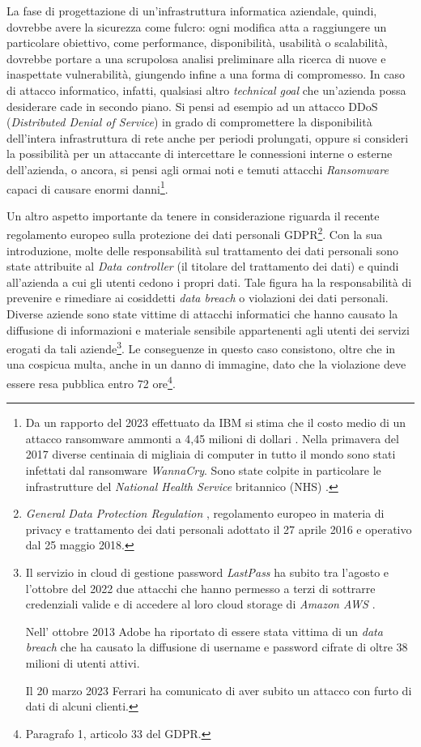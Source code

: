 \documentclass[target=bach,aauheader=]{thud}
\begin{document}
La fase di progettazione di un’infrastruttura informatica aziendale, quindi, dovrebbe avere la sicurezza come fulcro: ogni modifica atta a raggiungere un particolare obiettivo, come performance, disponibilità, usabilità o scalabilità, dovrebbe portare a una scrupolosa analisi preliminare alla ricerca di nuove e inaspettate vulnerabilità, giungendo infine a una forma di compromesso. In caso di attacco informatico, infatti, qualsiasi altro \textit{technical goal} che un’azienda possa desiderare cade in secondo piano. Si pensi ad esempio ad un attacco DDoS (\textit{Distributed Denial of Service}) in grado di compromettere la disponibilità dell’intera infrastruttura di rete anche per periodi prolungati, oppure si consideri la possibilità per un attaccante di intercettare le connessioni interne o esterne dell’azienda, o ancora, si pensi agli ormai noti e temuti attacchi \textit{Ransomware} capaci di causare enormi danni\footnote{Da un rapporto del 2023 effettuato da IBM si stima che il costo medio di un attacco ransomware ammonti a 4,45 milioni di dollari \cite{ibm}.
Nella primavera del 2017 diverse centinaia di migliaia di computer in tutto il mondo sono stati infettati dal ransomware \textit{WannaCry}. Sono state colpite in particolare le infrastrutture del \textit{National Health Service} britannico (NHS) \cite{nhs}.
}.

Un altro aspetto importante da tenere in considerazione riguarda il recente regolamento europeo sulla protezione dei dati personali GDPR\footnote{\textit{General Data Protection Regulation} \cite{gdpr}, regolamento europeo in materia di privacy e trattamento dei dati personali adottato il 27 aprile 2016 e operativo dal 25 maggio 2018.}. Con la sua introduzione, molte delle responsabilità sul trattamento dei dati personali sono state attribuite al \textit{Data controller} (il titolare del trattamento dei dati) e quindi all’azienda a cui gli utenti cedono i propri dati. Tale figura ha la responsabilità di prevenire e rimediare ai cosiddetti \textit{data breach} o violazioni dei dati personali. Diverse aziende sono state vittime di attacchi informatici che hanno causato la diffusione di informazioni e materiale sensibile appartenenti agli utenti dei servizi erogati da tali aziende\footnote{Il servizio in cloud di gestione password \textit{LastPass} ha subito tra l’agosto e l’ottobre del 2022 due attacchi che hanno permesso a terzi di sottrarre credenziali valide e di accedere al loro cloud storage di \textit{Amazon AWS \cite{lastpass}}.

Nell’ ottobre 2013 Adobe ha riportato di essere stata vittima di un \textit{data breach} che ha causato la diffusione di username e password cifrate di oltre 38 milioni di utenti attivi.

Il 20 marzo 2023 Ferrari ha comunicato di aver subito un attacco con furto di dati di alcuni clienti.
}. Le conseguenze in questo caso consistono, oltre che in una cospicua multa, anche in un danno di immagine, dato che la violazione deve essere resa pubblica entro 72 ore\footnote{Paragrafo 1, articolo 33 del GDPR.}.
\end{document}

